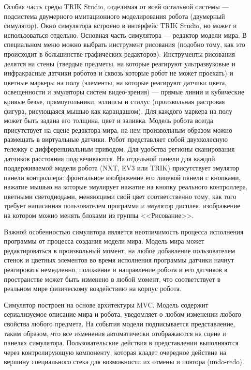 \documentclass[a5paper]{article}
\begin{document}
Особая часть среды TRIK Studio, отделимая от всей остальной системы --- подсистема двумерного имитационного моделирования робота (двумерный симулятор). Окно симулятора встроено в интерфейс TRIK Studio, но может и использоваться отдельно. Основная часть симулятора --- редактор модели мира. В специальном меню можно выбрать инструмент рисования (подобно тому, как это происходит в большинстве графических редакторов). Инструменты рисования делятся на стены (твердые предметы, на которые реагируют ультразвуковые и инфракрасные датчики роботов и сквозь которые робот не может проехать) и цветные маркеры на полу (элементы, на которые реагируют датчики цвета, освещенности и эмуляторы систем видео-зрения) --- прямые линии и кубические кривые безье, прямоугольники, эллипсы и стилус (произвольная растровая фигура, рисующаяся мышью как карандашом). Для каждого маркера на полу может быть задана его толщина, цвет и заливка. Модель робота всегда присутствует на сцене редактора мира, на нем произвольным образом можно размещать в виртуальные датчики. Робот представляет собой двухколесную тележку с дифференциальным приводом. Для удобства регионы сканирования датчиков расстояния подсвечиваются. На отдельной панели для каждой поддерживаемой модели робота (NXT, EV3 или TRIK) присутствует эмулятор панели контроллера: фронтальное изображение его лицевой панели с кнопками, нажатие мышью на которые эмулирует нажатие на кнопку реального контроллера, цветными светодиодами, меняющими свой цвет соответственно тому, как того требует написанная пользователем программа и эмулятор дисплея, изображение на котором можно менять блоками из группы <<Рисование>>.

Важной особенностью симулятора является неотличимость процесса исполнения программы от процесса создания модели мира. Модель мира может редактироваться в произвольный момент, на любое добавление пользователем стенок и цветных элементов во время исполнения программы датчики начнут реагировать немедленно, положение и направление робота и его датчиков в пространстве может быть изменено в любой момент, что соответствует в реальном мире физическому воздействию на корпус робота.

Симулятор построен на основе архитектуры MVC. Модель содержит сериализуемое описание мира и робота, уведомляет о любом изменении любого свойства любого предмета. На события модели подписывается представление, таким образом, что все изменения автоматически отображаются на сцене и панелях симулятора. Пользовательские действия в представлении выполняются через контролирующую компоненту, которая кладет очередное действие на вершину специального стека для возможности их отмены и повтора (undo-redo). 
\end{document}
